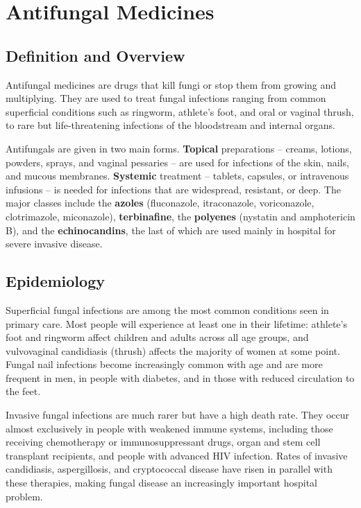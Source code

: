 \chapter{Antifungal Medicines}

\section*{Definition and Overview}
Antifungal medicines are drugs that kill fungi or stop them from growing and multiplying. They are used to treat fungal infections ranging from common superficial conditions such as ringworm, athlete's foot, and oral or vaginal thrush, to rare but life-threatening infections of the bloodstream and internal organs.

Antifungals are given in two main forms. \textbf{Topical} preparations -- creams, lotions, powders, sprays, and vaginal pessaries -- are used for infections of the skin, nails, and mucous membranes. \textbf{Systemic} treatment -- tablets, capsules, or intravenous infusions -- is needed for infections that are widespread, resistant, or deep. The major classes include the \textbf{azoles} (fluconazole, itraconazole, voriconazole, clotrimazole, miconazole), \textbf{terbinafine}, the \textbf{polyenes} (nystatin and amphotericin B), and the \textbf{echinocandins}, the last of which are used mainly in hospital for severe invasive disease.

\section*{Epidemiology}
Superficial fungal infections are among the most common conditions seen in primary care. Most people will experience at least one in their lifetime: athlete's foot and ringworm affect children and adults across all age groups, and vulvovaginal candidiasis (thrush) affects the majority of women at some point. Fungal nail infections become increasingly common with age and are more frequent in men, in people with diabetes, and in those with reduced circulation to the feet.

Invasive fungal infections are much rarer but have a high death rate. They occur almost exclusively in people with weakened immune systems, including those receiving chemotherapy or immunosuppressant drugs, organ and stem cell transplant recipients, and people with advanced HIV infection. Rates of invasive candidiasis, aspergillosis, and cryptococcal disease have risen in parallel with these therapies, making fungal disease an increasingly important hospital problem.

